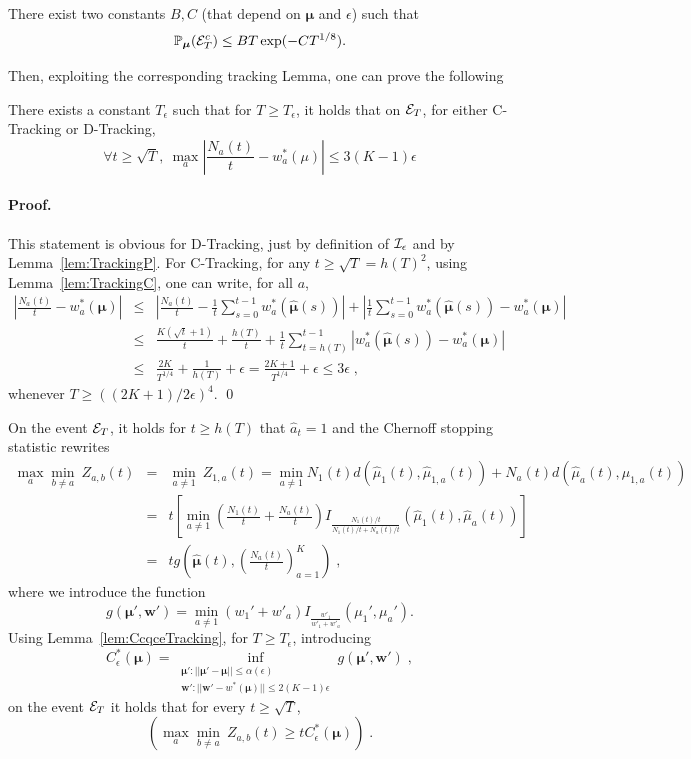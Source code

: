 \documentclass{colt2016} %
\begin{document}
\begin{lemma}\label{lem:concSimple} There exist two constants $B,C$ (that depend on $\bm \mu$ and $\epsilon$) such that \[\mathbb{P}_{\bm \mu}(\mathcal{E}_T^c) \leq B T \exp(-C T^{1/8}).\] 
\end{lemma}

Then, exploiting the corresponding tracking Lemma, one can prove the following 

\begin{lemma}\label{lem:CcqceTracking} There exists a constant $T_\epsilon$ such that for $T \geq T_\epsilon$, it holds that on $\mathcal{E}_T$, for either C-Tracking or D-Tracking, 
 \[\forall t \geq \sqrt{T}, \ \max_a \left|\frac{N_a(t)}{t} - w_a^*(\mu)\right| \leq 3(K-1)\epsilon\]
\end{lemma}

\paragraph{Proof.} This statement is obvious for D-Tracking, just by definition of $\mathcal{I}_\epsilon$ and by Lemma~\ref{lem:TrackingP}. For C-Tracking, for any $t \geq \sqrt{T}=h(T)^2$, using Lemma~\ref{lem:TrackingC}, one can write, for all $a$,
\begin{eqnarray*}
 \left|\frac{N_a(t)}{t} - w_a^*(\bm \mu)\right| & \leq & \left|\frac{N_a(t)}{t} - \frac{1}{t} \sum_{s=0}^{t-1} w_a^*(\hat{\bm \mu}(s))\right| + \left|\frac{1}{t} \sum_{s=0}^{t-1} w_a^*(\hat{\bm \mu}(s)) - w_a^*(\bm \mu)\right| \\
 & \leq & \frac{K(\sqrt{t} +1)}{{t}} + \frac{h(T)}{t} + \frac{1}{t}\sum_{t=h(T)}^{t-1} |w_a^*(\hat{\bm \mu}(s)) - w_a^*(\bm \mu)| \\
 &\leq &\frac{2K}{T^{1/4}} + \frac{1}{h(T)} + \epsilon = \frac{2K + 1 }{T^{1/4}} + \epsilon \leq 3\epsilon\;,
\end{eqnarray*}
whenever $T \geq ((2K+1)/2\epsilon)^4$. 
\qed


On the event $\mathcal{E}_T$, it holds for $t \geq h(T)$ that $\hat{a}_t=1$ and the Chernoff stopping statistic rewrites 
\begin{eqnarray*} 
 \max_a \min_{b \neq a} \ Z_{a,b}(t) & = & \min_{a \neq 1} \ Z_{1,a}(t) =  \min_{a \neq 1} N_1(t)d(\hat{\mu}_1(t) , \hat{\mu}_{1,a}(t)) + N_a(t) d(\hat{\mu}_a(t),\mu_{1,a}(t))\\
 & = & t \left[\min_{a \neq 1} \left(\frac{N_1(t)}{t} + \frac{N_a(t)}{t}\right)I_{\frac{N_1(t)/t}{N_1(t)/t + N_a(t)/t}}\left(\hat{\mu}_1(t),\hat{\mu}_a(t)\right)  \right] \\
 & = & t  g \left(\hat{\bm \mu}(t),\left(\frac{N_a(t)}{t}\right)_{a=1}^K\right)\;, 
\end{eqnarray*}
where we introduce the function 
\[g(\bm \mu',\bm w') = \min_{a \neq 1}(w_1' + w'_a) I_{\frac{w'_1}{w'_1 + w'_a}}(\mu_1',\mu_a').\]
Using Lemma~\ref{lem:CcqceTracking}, for $T\geq T_\epsilon$, introducing
\[C^*_\epsilon(\bm \mu) = \inf_{\substack{\bm \mu' : ||\bm\mu' - \bm \mu|| \leq \alpha(\epsilon) \\ \bm w' : ||\bm w' -w^*(\bm \mu)||\leq 2(K-1)\epsilon}} g(\bm \mu',\bm w')\;,\]
on the event $\mathcal{E}_T$ it holds that for every $t \geq \sqrt{T}$, 
\[\left(\max_a \min_{b \neq a} \ Z_{a,b}(t) \geq t C^*_\epsilon(\bm \mu)\right)\;.\]
\end{document}
